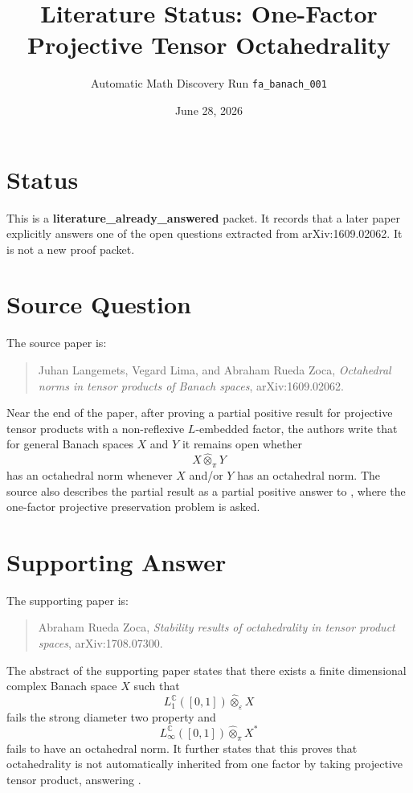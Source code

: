 \documentclass[11pt]{article}
\title{Literature Status: One-Factor Projective Tensor Octahedrality}
\author{Automatic Math Discovery Run \texttt{fa\_banach\_001}}
\date{June 28, 2026}
\begin{document}
\maketitle

\section*{Status}

This is a \textbf{literature\_already\_answered} packet.  It records that a
later paper explicitly answers one of the open questions extracted from
arXiv:1609.02062.  It is not a new proof packet.

\section*{Source Question}

The source paper is:

\begin{quote}
Juhan Langemets, Vegard Lima, and Abraham Rueda Zoca,
\emph{Octahedral norms in tensor products of Banach spaces},
arXiv:1609.02062.
\end{quote}

Near the end of the paper, after proving a partial positive result for
projective tensor products with a non-reflexive \(L\)-embedded factor, the
authors write that for general Banach spaces \(X\) and \(Y\) it remains open
whether
\[
  X \widehat\otimes_\pi Y
\]
has an octahedral norm whenever \(X\) and/or \(Y\) has an octahedral norm.
The source also describes the partial result as a partial positive answer to
\cite[Question~4.4]{LLR2017}, where the one-factor projective preservation
problem is asked.

\section*{Supporting Answer}

The supporting paper is:

\begin{quote}
Abraham Rueda Zoca,
\emph{Stability results of octahedrality in tensor product spaces},
arXiv:1708.07300.
\end{quote}

The abstract of the supporting paper states that there exists a finite
dimensional complex Banach space \(X\) such that
\[
  L_1^\mathbb C([0,1]) \widehat\otimes_\varepsilon X
\]
fails the strong diameter two property and
\[
  L_\infty^\mathbb C([0,1]) \widehat\otimes_\pi X^*
\]
fails to have an octahedral norm.  It further states that this proves that
octahedrality is not automatically inherited from one factor by taking
projective tensor product, answering \cite[Question~4.4]{LLR2017}.
\end{document}
